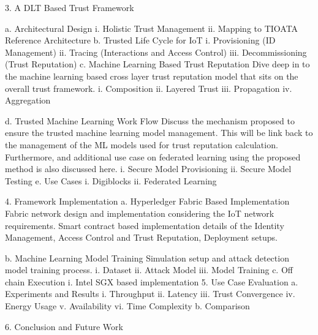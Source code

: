 3.	A DLT Based Trust Framework 

a.	Architectural Design 
i.	Holistic Trust Management
ii.	Mapping to TIOATA Reference Architecture
b.	Trusted Life Cycle for IoT 
i.	Provisioning (ID Management)
ii.	Tracing (Interactions and Access Control)
iii.	Decommissioning (Trust Reputation)
c.	Machine Learning Based Trust Reputation
Dive deep in to the machine learning based cross layer trust reputation model that sits on the overall trust framework.
i.	Composition 
ii.	Layered Trust
iii.	Propagation
iv.	Aggregation

d.	Trusted Machine Learning Work Flow
Discuss the mechanism proposed to ensure the trusted machine learning model management. This will be link back to the management of the ML models used for trust reputation calculation. Furthermore, and additional use case on federated learning using the proposed method is also discussed here.
i.	Secure Model Provisioning
ii.	Secure Model Testing
e.	Use Cases
i.	Digiblocks
ii.	Federated Learning




4.	Framework Implementation
a.	Hyperledger Fabric Based Implementation
Fabric network design and implementation considering the IoT network requirements.  
Smart contract based implementation details of the Identity Management, Access Control and Trust Reputation, Deployment setups.

b.	Machine Learning Model Training 
Simulation setup and attack detection model training process. 
i.	Dataset
ii.	Attack Model
iii.	Model Training
c.	Off chain Execution 
i.	Intel SGX based implementation
5.	Use Case Evaluation
a.	Experiments and Results 
i.	Throughput 
ii.	Latency
iii.	Trust Convergence 
iv.	Energy Usage
v.	Availability
vi.	Time Complexity
b.	Comparison

6.	Conclusion and Future Work


